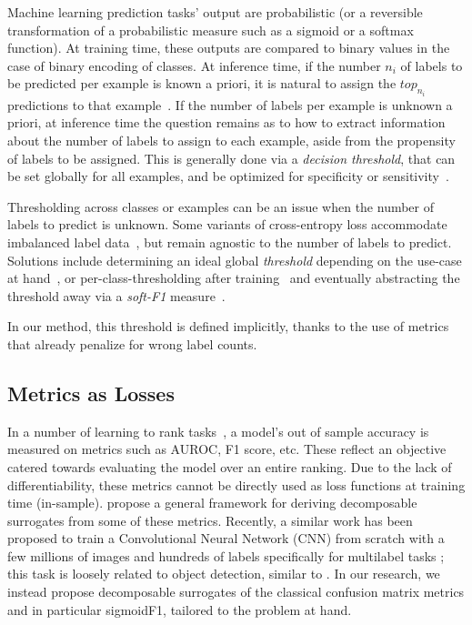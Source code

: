 Machine learning prediction tasks' output are probabilistic (or a reversible transformation of a probabilistic measure such as a sigmoid or a softmax function). 
At training time, these outputs are compared to binary
values in the case of binary encoding of classes. 
At inference time, if the number $n_i$ of labels to be predicted per example is known a priori, it is natural to assign the $top_{n_i}$ predictions to that example~\cite{lossTopKError, topKmulticlassSVM}. 
If the number of labels per example is unknown a priori,  at inference time the question remains as to how to extract information about the number of labels to assign to each example, aside from the propensity of labels to be assigned. 
This is generally done via a \emph{decision threshold}, that can be set globally for all examples, and be
optimized for specificity or sensitivity~\cite{decisionThreshold}. 

Thresholding across classes or examples can be an issue when the number of labels to predict is unknown. Some variants of cross-entropy loss accommodate imbalanced label data~\cite{focalLoss}, but remain agnostic to the number of labels to predict. 
Solutions include determining an ideal global \emph{threshold} depending on the use-case at hand~\cite{threshForF1}, or per-class-thresholding after training~\cite{moviePosters} and eventually abstracting the threshold away via a \emph{soft-F1} measure~\cite{softF1}. 

In our method, this threshold is defined implicitly, thanks to the use of metrics that already penalize for
wrong label counts.


\subsection{Metrics as Losses}

In a number of learning to rank tasks~\cite{LTR}, a model's out of sample accuracy is measured on metrics such as AUROC, F1 score, etc. These reflect an objective catered towards evaluating the model over an entire ranking. Due to the lack of differentiability, these metrics cannot be directly used as loss
functions at training time (in-sample). \citet{optimizableLosses} propose a general framework for deriving
decomposable surrogates from some of these metrics. 
Recently, a similar work has been proposed to train a Convolutional
Neural Network (CNN) from scratch with a few millions of images and hundreds
of labels specifically for multilabel tasks \cite{tencent}; this task is loosely related to object detection, similar to \cite{multitaskLabelImages}.
In our research, we instead propose decomposable surrogates of the classical confusion matrix metrics and in particular sigmoidF1, tailored to the problem at hand.

